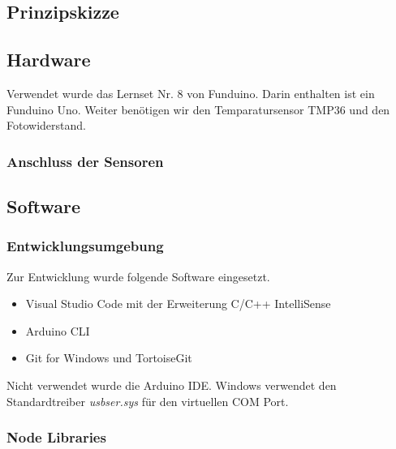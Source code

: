 \hypertarget{prinzipskizze}{%
\subsection{Prinzipskizze}\label{prinzipskizze}}

\hypertarget{hardware}{%
\subsection{Hardware}\label{hardware}}

Verwendet wurde das Lernset Nr. 8 von Funduino\autocite{lernset}. Darin
enthalten ist ein Funduino Uno. Weiter benötigen wir den
Temparatursensor TMP36 und den Fotowiderstand.

\hypertarget{anschluss-der-sensoren}{%
\subsubsection{Anschluss der Sensoren}\label{anschluss-der-sensoren}}

\hypertarget{software}{%
\subsection{Software}\label{software}}

\hypertarget{entwicklungsumgebung}{%
\subsubsection{Entwicklungsumgebung}\label{entwicklungsumgebung}}

Zur Entwicklung wurde folgende Software eingesetzt.

\begin{itemize}
\item
  Visual Studio Code\autocite{vscode} mit der Erweiterung C/C++
  IntelliSense\autocite{intellisense}
\item
  Arduino CLI\autocite{arduinoCli}
\item
  Git for Windows\autocite{gitForWindows} und
  TortoiseGit\autocite{tortoiseGit}
\end{itemize}

Nicht verwendet wurde die Arduino IDE. Windows verwendet den
Standardtreiber \emph{usbser.sys} für den virtuellen COM Port.

\hypertarget{node-libraries}{%
\subsubsection{Node Libraries}\label{node-libraries}}


